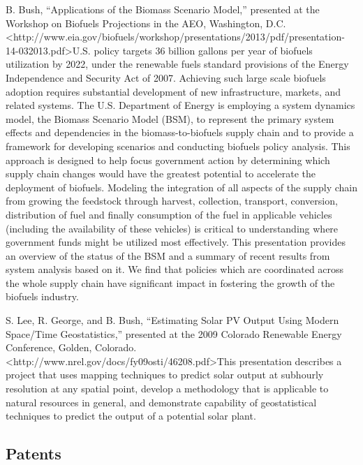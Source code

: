 \documentclass[]{article}
\begin{document}
B. Bush, ``Applications of the Biomass Scenario Model,'' presented at
the Workshop on Biofuels Projections in the AEO, Washington, D.C.
\textless{}http://www.eia.gov/biofuels/workshop/presentations/2013/pdf/presentation-14-032013.pdf\textgreater{}U.S.
policy targets 36 billion gallons per year of biofuels utilization by
2022, under the renewable fuels standard provisions of the Energy
Independence and Security Act of 2007. Achieving such large scale
biofuels adoption requires substantial development of new
infrastructure, markets, and related systems. The U.S. Department of
Energy is employing a system dynamics model, the Biomass Scenario Model
(BSM), to represent the primary system effects and dependencies in the
biomass-to-biofuels supply chain and to provide a framework for
developing scenarios and conducting biofuels policy analysis. This
approach is designed to help focus government action by determining
which supply chain changes would have the greatest potential to
accelerate the deployment of biofuels. Modeling the integration of all
aspects of the supply chain from growing the feedstock through harvest,
collection, transport, conversion, distribution of fuel and finally
consumption of the fuel in applicable vehicles (including the
availability of these vehicles) is critical to understanding where
government funds might be utilized most effectively. This presentation
provides an overview of the status of the BSM and a summary of recent
results from system analysis based on it. We find that policies which
are coordinated across the whole supply chain have significant impact in
fostering the growth of the biofuels industry.

S. Lee, R. George, and B. Bush, ``Estimating Solar PV Output Using
Modern Space/Time Geostatistics,'' presented at the 2009 Colorado
Renewable Energy Conference, Golden, Colorado.
\textless{}http://www.nrel.gov/docs/fy09osti/46208.pdf\textgreater{}This
presentation describes a project that uses mapping techniques to predict
solar output at subhourly resolution at any spatial point, develop a
methodology that is applicable to natural resources in general, and
demonstrate capability of geostatistical techniques to predict the
output of a potential solar plant.

\subsection{Patents}\label{patents}
\end{document}
